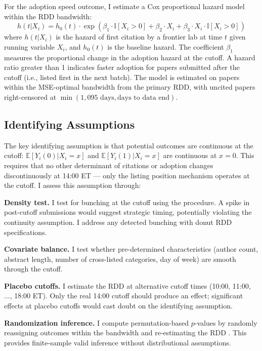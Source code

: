 \documentclass[12pt]{article}
\newcommand{\E}{\mathbb{E}}
\newcommand{\ind}{\mathbb{I}}
\begin{document}
For the adoption speed outcome, I estimate a Cox proportional hazard model \citep{cox1972} within the RDD bandwidth:
\begin{equation}
    h(t | X_i) = h_0(t) \cdot \exp\left(\beta_1 \cdot \ind[X_i > 0] + \beta_2 \cdot X_i + \beta_3 \cdot X_i \cdot \ind[X_i > 0]\right)
\end{equation}
where $h(t | X_i)$ is the hazard of first citation by a frontier lab at time $t$ given running variable $X_i$, and $h_0(t)$ is the baseline hazard. The coefficient $\beta_1$ measures the proportional change in the adoption hazard at the cutoff. A hazard ratio greater than 1 indicates faster adoption for papers submitted after the cutoff (i.e., listed first in the next batch). The model is estimated on papers within the MSE-optimal bandwidth from the primary RDD, with uncited papers right-censored at $\min(1{,}095 \text{ days}, \text{days to data end})$.

\subsection{Identifying Assumptions}

The key identifying assumption is that potential outcomes are continuous at the cutoff: $\E[Y_i(0) | X_i = x]$ and $\E[Y_i(1) | X_i = x]$ are continuous at $x = 0$. This requires that no other determinant of citations or adoption changes discontinuously at 14:00 ET --- only the listing position mechanism operates at the cutoff. I assess this assumption through:

\textbf{Density test.} I test for bunching at the cutoff using the \citet{cattaneo2020inference} procedure. A spike in post-cutoff submissions would suggest strategic timing, potentially violating the continuity assumption. I address any detected bunching with donut RDD specifications.

\textbf{Covariate balance.} I test whether pre-determined characteristics (author count, abstract length, number of cross-listed categories, day of week) are smooth through the cutoff.

\textbf{Placebo cutoffs.} I estimate the RDD at alternative cutoff times (10:00, 11:00, ..., 18:00 ET). Only the real 14:00 cutoff should produce an effect; significant effects at placebo cutoffs would cast doubt on the identifying assumption.

\textbf{Randomization inference.} I compute permutation-based $p$-values by randomly reassigning outcomes within the bandwidth and re-estimating the RDD \citep{cattaneo2015}. This provides finite-sample valid inference without distributional assumptions.
\end{document}
